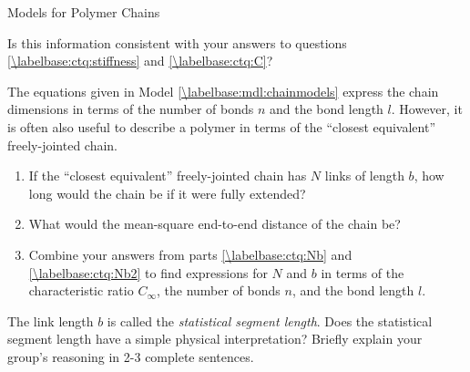 \begin{activity}{Models for Polymer Chains}
\begin{infobox}
\end{infobox}

\begin{ctqs}

	\question Is this information consistent with your answers to questions \ref{\labelbase:ctq:stiffness} and \ref{\labelbase:ctq:C}?
	
		\begin{solution}[0.75in]
		\end{solution}
	
	\question The equations given in Model \ref{\labelbase:mdl:chainmodels} express the chain dimensions in terms of the number of bonds $n$ and the bond length $l$.  However, it is often also useful to describe a polymer in terms of the ``closest equivalent'' freely-jointed chain.
	
		\begin{enumerate}
			\item  If the ``closest equivalent'' freely-jointed chain has $N$ links of length $b$, how long would the chain be if it were fully extended? \label{\labelbase:ctq:Nb}
	
		\begin{solution}[0.75in]
		\end{solution}
			
			\item What would the mean-square end-to-end distance of the chain be? \label{\labelbase:ctq:Nb2}
	
		\begin{solution}[0.75in]
		\end{solution}
			
			\item Combine your answers from parts \ref{\labelbase:ctq:Nb} and \ref{\labelbase:ctq:Nb2} to find expressions for $N$ and $b$ in terms of the characteristic ratio $C_\infty$, the number of bonds $n$, and the bond length $l$.
	
		\begin{solution}[1.25in]
		\end{solution}
		\end{enumerate}
		
	\question The link length $b$ is called the \emph{statistical segment length}.  Does the statistical segment length have a simple physical interpretation?  Briefly explain your group's reasoning in 2-3 complete sentences.
	
		\begin{solution}[1.5in]
		\end{solution}
	

\end{ctqs}
\end{activity}
